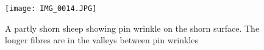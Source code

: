%

\begin{figure}[!h]
  \centering
  \texttt{[image: IMG\_0014.JPG]}
  \caption{A partly shorn sheep showing pin wrinkle on the shorn surface. The longer fibres are in the valleys between pin wrinkles}
  \label{fig:pin}
\end{figure}

%

